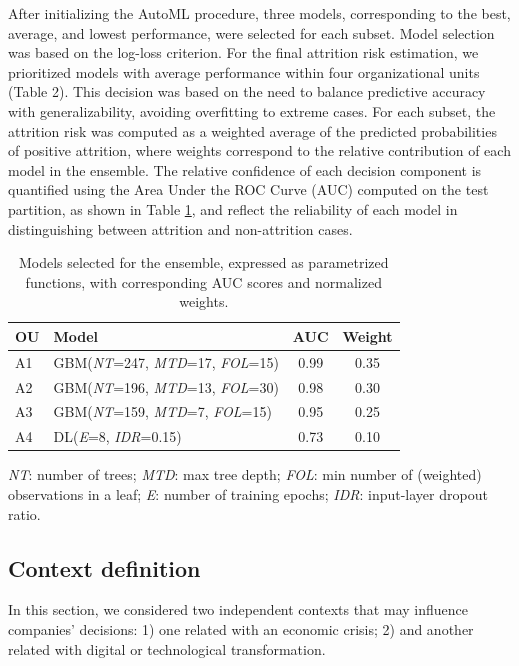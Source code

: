 \documentclass[runningheads]{llncs}
\begin{document}
After initializing the AutoML procedure, three models, corresponding to the best, average, and lowest performance, were selected for each subset. Model selection was based on the log-loss criterion. For the final attrition risk estimation, we prioritized models with average performance within four organizational units (Table 2). This decision was based on the need to balance predictive accuracy with generalizability, avoiding overfitting to extreme cases. For each subset, the attrition risk was computed as a weighted average of the predicted probabilities of positive attrition, where weights correspond to the relative contribution of each model in the ensemble. The relative confidence of each decision component is quantified using the Area Under the ROC Curve (AUC) computed on the test partition, as shown in Table \ref{tab:ou_models}, and reflect the reliability of each model in distinguishing between attrition and non-attrition cases.

\begin{table}[h!]
\centering
\caption{Models selected for the ensemble, expressed as parametrized functions, with corresponding AUC scores and normalized weights.}
\setlength{\tabcolsep}{8pt}
\renewcommand{\arraystretch}{1.3}
\begin{tabular}{|l |l| c |c|}
\hline
\textbf{OU} & \textbf{Model} & \textbf{AUC} & \textbf{Weight} \\
\hline
A1 & GBM(\textit{NT}=247, \textit{MTD}=17, \textit{FOL}=15) & 0.99 & 0.35 \\
\hline
A2 & GBM(\textit{NT}=196, \textit{MTD}=13, \textit{FOL}=30) & 0.98 & 0.30 \\
\hline
A3 & GBM(\textit{NT}=159, \textit{MTD}=7,  \textit{FOL}=15) & 0.95 & 0.25 \\
\hline
A4 & DL(\textit{E}=8, \textit{IDR}=0.15)                   & 0.73 & 0.10 \\
\hline
\end{tabular}

\vspace{1.5mm}
\footnotesize{
\textit{NT}: number of trees; 
\textit{MTD}: max tree depth; 
\textit{FOL}: min number of (weighted) observations in a leaf; 
\textit{E}: number of training epochs; 
\textit{IDR}: input-layer dropout ratio.
}
\label{tab:ou_models}
\end{table}
\subsection{Context definition} 
In this section, we considered two independent contexts that may influence companies' decisions: 1) one related with an economic crisis; 2) and another related with digital or technological transformation.
\end{document}
